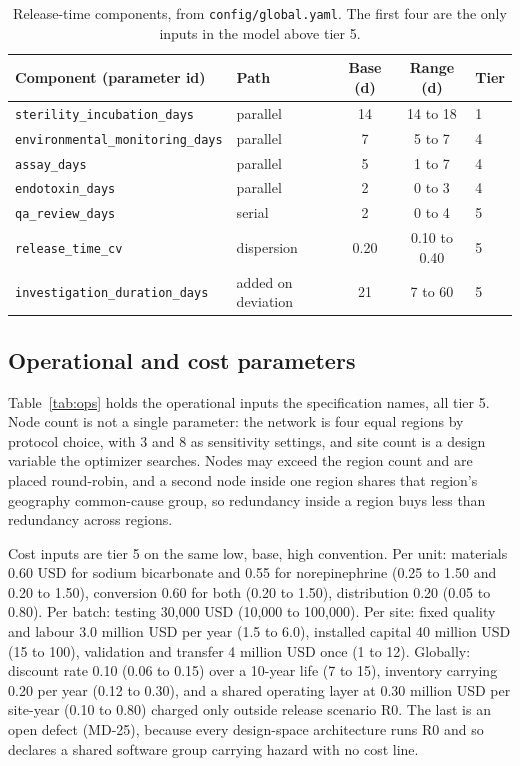 \begin{table}[htbp]
\centering
\caption{Release-time components, from \texttt{config/global.yaml}. The first four are the only
inputs in the model above tier 5.}
\label{tab:release}
\footnotesize
\setlength{\tabcolsep}{5pt}
\begin{tabular}{@{}llccl@{}}
\toprule
Component (parameter id) & Path & Base (d) & Range (d) & Tier \\
\midrule
\texttt{sterility\_incubation\_days} & parallel & 14 & 14 to 18 & 1 \\
\texttt{environmental\_monitoring\_days} & parallel & 7 & 5 to 7 & 4 \\
\texttt{assay\_days} & parallel & 5 & 1 to 7 & 4 \\
\texttt{endotoxin\_days} & parallel & 2 & 0 to 3 & 4 \\
\texttt{qa\_review\_days} & serial & 2 & 0 to 4 & 5 \\
\texttt{release\_time\_cv} & dispersion & 0.20 & 0.10 to 0.40 & 5 \\
\texttt{investigation\_duration\_days} & added on deviation & 21 & 7 to 60 & 5 \\
\bottomrule
\end{tabular}
\end{table}

\subsection{Operational and cost parameters}

Table~\ref{tab:ops} holds the operational inputs the specification names, all tier 5. Node count
is not a single parameter: the network is four equal regions by protocol choice, with 3 and 8 as
sensitivity settings, and site count is a design variable the optimizer searches. Nodes may
exceed the region count and are placed round-robin, and a second node inside one region shares
that region's geography common-cause group, so redundancy inside a region buys less than
redundancy across regions.

Cost inputs are tier 5 on the same low, base, high convention. Per unit: materials 0.60 USD for
sodium bicarbonate and 0.55 for norepinephrine (0.25 to 1.50 and 0.20 to 1.50), conversion 0.60
for both (0.20 to 1.50), distribution 0.20 (0.05 to 0.80). Per batch: testing 30{,}000 USD
(10{,}000 to 100{,}000). Per site: fixed quality and labour 3.0 million USD per year (1.5 to
6.0), installed capital 40 million USD (15 to 100), validation and transfer 4 million USD once
(1 to 12). Globally: discount rate 0.10 (0.06 to 0.15) over a 10-year life (7 to 15), inventory
carrying 0.20 per year (0.12 to 0.30), and a shared operating layer at 0.30 million USD per
site-year (0.10 to 0.80) charged only outside release scenario R0. The last is an open defect
(MD-25), because every design-space architecture runs R0 and so declares a shared software group
carrying hazard with no cost line.

